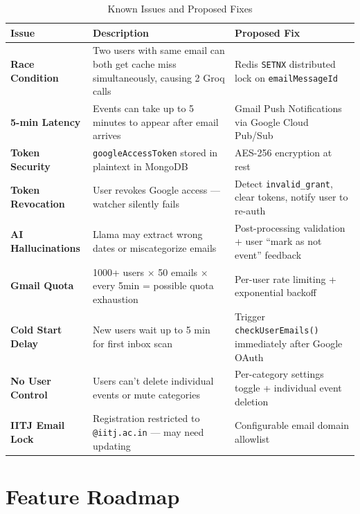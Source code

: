 \documentclass[12pt,a4paper]{report}
\begin{document}
\begin{table}[H]
\centering
{}
\begin{tabularx}{\textwidth}{>{\bfseries}l X X}
\rowcolor{tableheadbg}
\color{white}Issue & \color{white}Description & \color{white}Proposed Fix \\
\toprule
Race Condition     & Two users with same email can both get cache miss simultaneously, causing 2 Groq calls & Redis \texttt{SETNX} distributed lock on \texttt{emailMessageId} \\
5-min Latency      & Events can take up to 5 minutes to appear after email arrives & Gmail Push Notifications via Google Cloud Pub/Sub \\
Token Security     & \texttt{googleAccessToken} stored in plaintext in MongoDB & AES-256 encryption at rest \\
Token Revocation   & User revokes Google access — watcher silently fails & Detect \texttt{invalid\_grant}, clear tokens, notify user to re-auth \\
AI Hallucinations  & Llama may extract wrong dates or miscategorize emails & Post-processing validation + user ``mark as not event'' feedback \\
Gmail Quota        & 1000+ users × 50 emails × every 5min = possible quota exhaustion & Per-user rate limiting + exponential backoff \\
Cold Start Delay   & New users wait up to 5 min for first inbox scan & Trigger \texttt{checkUserEmails()} immediately after Google OAuth \\
No User Control    & Users can't delete individual events or mute categories & Per-category settings toggle + individual event deletion \\
IITJ Email Lock    & Registration restricted to \texttt{@iitj.ac.in} — may need updating & Configurable email domain allowlist \\
\bottomrule
\end{tabularx}
\caption{Known Issues and Proposed Fixes}
\end{table}

\section{Feature Roadmap}
\end{document}
